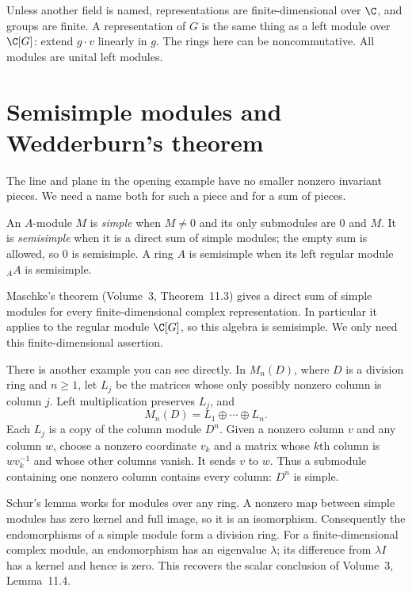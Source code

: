 Unless another field is named, representations are finite-dimensional over $\C$, and groups are finite. A representation of $G$ is the same thing as a left module over $\C[G]$: extend $g\cdot v$ linearly in $g$. The rings here can be noncommutative. All modules are unital left modules.

\section{Semisimple modules and Wedderburn's theorem}

The line and plane in the opening example have no smaller nonzero invariant pieces. We need a name both for such a piece and for a sum of pieces.

\begin{definition}\label{def:semisimple}
An $A$-module $M$ is \emph{simple} when $M\ne0$ and its only submodules are $0$ and $M$. It is \emph{semisimple} when it is a direct sum of simple modules; the empty sum is allowed, so $0$ is semisimple. A ring $A$ is semisimple when its left regular module ${}_AA$ is semisimple.
\end{definition}

Maschke's theorem (Volume~3, Theorem~11.3) gives a direct sum of simple modules for every finite-dimensional complex representation. In particular it applies to the regular module $\C[G]$, so this algebra is semisimple. We only need this finite-dimensional assertion.

There is another example you can see directly. In $M_n(D)$, where $D$ is a division ring and $n\ge1$, let $L_j$ be the matrices whose only possibly nonzero column is column $j$. Left multiplication preserves $L_j$, and
\[
M_n(D)=L_1\oplus\cdots\oplus L_n.
\]
Each $L_j$ is a copy of the column module $D^n$. Given a nonzero column $v$ and any column $w$, choose a nonzero coordinate $v_k$ and a matrix whose $k$th column is $wv_k^{-1}$ and whose other columns vanish. It sends $v$ to $w$. Thus a submodule containing one nonzero column contains every column: $D^n$ is simple.

Schur's lemma works for modules over any ring. A nonzero map between simple modules has zero kernel and full image, so it is an isomorphism. Consequently the endomorphisms of a simple module form a division ring. For a finite-dimensional complex module, an endomorphism has an eigenvalue $\lambda$; its difference from $\lambda I$ has a kernel and hence is zero. This recovers the scalar conclusion of Volume~3, Lemma~11.4.


